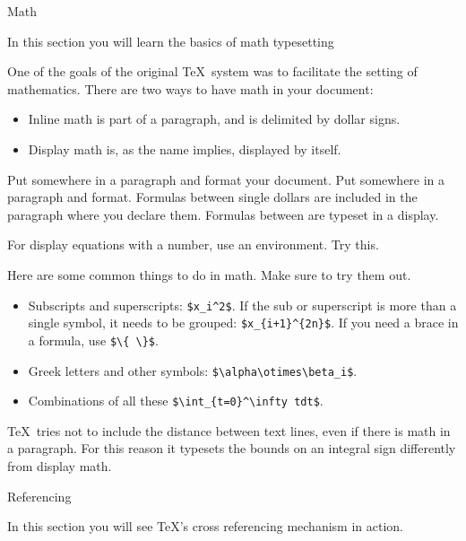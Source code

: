  {Math}

\begin{purpose}
  In this section you will learn the basics of math typesetting
\end{purpose}

One of the goals of the original \TeX\ system was to facilitate the
setting of mathematics. There are two ways to have math in your
document:
\begin{itemize}
\item Inline math is part of a paragraph, and is delimited by dollar
  signs. 
\item Display math is, as the name implies, displayed by itself. 
\end{itemize}

\practical
{Put  somewhere in a paragraph and format your document.
Put  \n{\\[x+y\\]} somewhere in a paragraph and format.}
{Formulas between single dollars are included in the paragraph where
  you declare them. Formulas between \n{\\[...\\]} are typeset in a
  display.}
{}

For display
equations with a number, use an  environment. Try this.

Here are some common things to do in math. Make sure to try them out.
\begin{itemize}
\item Subscripts and superscripts: \verb-$x_i^2$-. If the sub or superscript
  is more than a single symbol, it needs to be grouped:
  \verb-$x_{i+1}^{2n}$-. If you need a brace in a formula, use
  \verb-$\{ \}$-.
\item Greek letters and other symbols: \verb-$\alpha\otimes\beta_i$-.
\item Combinations of all these \verb-$\int_{t=0}^\infty tdt$-.
\end{itemize}

{\TeX\ tries not to include the distance between text lines, even if
  there is math in a paragraph. For this reason it typesets the bounds
  on an integral sign differently from display math.}{}

 {Referencing}

\begin{purpose}
  In this section you will see \TeX's cross referencing mechanism in action.
\end{purpose}

